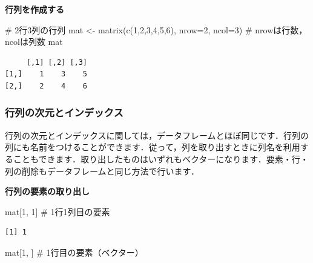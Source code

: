 \documentclass[
  letterpaper,
  DIV=11,
  numbers=noendperiod]{scrreprt}
\newenvironment{Shaded}{\begin{snugshade}}{\end{snugshade}}
\newcommand{\AttributeTok}[1]{\textcolor[rgb]{0.40,0.45,0.13}{#1}}
\newcommand{\CommentTok}[1]{\textcolor[rgb]{0.37,0.37,0.37}{#1}}
\newcommand{\DecValTok}[1]{\textcolor[rgb]{0.68,0.00,0.00}{#1}}
\newcommand{\FunctionTok}[1]{\textcolor[rgb]{0.28,0.35,0.67}{#1}}
\newcommand{\NormalTok}[1]{\textcolor[rgb]{0.00,0.23,0.31}{#1}}
\newcommand{\OtherTok}[1]{\textcolor[rgb]{0.00,0.23,0.31}{#1}}
\begin{document}
\textbf{行列を作成する}

\begin{Shaded}
\begin{Highlighting}[]
\CommentTok{\# 2行3列の行列}
\NormalTok{mat }\OtherTok{\textless{}{-}} \FunctionTok{matrix}\NormalTok{(}\FunctionTok{c}\NormalTok{(}\DecValTok{1}\NormalTok{,}\DecValTok{2}\NormalTok{,}\DecValTok{3}\NormalTok{,}\DecValTok{4}\NormalTok{,}\DecValTok{5}\NormalTok{,}\DecValTok{6}\NormalTok{), }\AttributeTok{nrow=}\DecValTok{2}\NormalTok{, }\AttributeTok{ncol=}\DecValTok{3}\NormalTok{) }\CommentTok{\# nrowは行数，ncolは列数}
\NormalTok{mat}
\end{Highlighting}
\end{Shaded}

\begin{verbatim}
     [,1] [,2] [,3]
[1,]    1    3    5
[2,]    2    4    6
\end{verbatim}

\hypertarget{ux884cux5217ux306eux6b21ux5143ux3068ux30a4ux30f3ux30c7ux30c3ux30afux30b9}{%
\subsubsection{行列の次元とインデックス}\label{ux884cux5217ux306eux6b21ux5143ux3068ux30a4ux30f3ux30c7ux30c3ux30afux30b9}}

行列の次元とインデックスに関しては，データフレームとほぼ同じです．行列の列にも名前をつけることができます．従って，列を取り出すときに列名を利用することもできます．取り出したものはいずれもベクターになります．要素・行・列の削除もデータフレームと同じ方法で行います．

\textbf{行列の要素の取り出し}

\begin{Shaded}
\begin{Highlighting}[]
\NormalTok{mat[}\DecValTok{1}\NormalTok{, }\DecValTok{1}\NormalTok{] }\CommentTok{\# 1行1列目の要素}
\end{Highlighting}
\end{Shaded}

\begin{verbatim}
[1] 1
\end{verbatim}

\begin{Shaded}
\begin{Highlighting}[]
\NormalTok{mat[}\DecValTok{1}\NormalTok{, ] }\CommentTok{\# 1行目の要素（ベクター）}
\end{Highlighting}
\end{Shaded}
\end{document}
